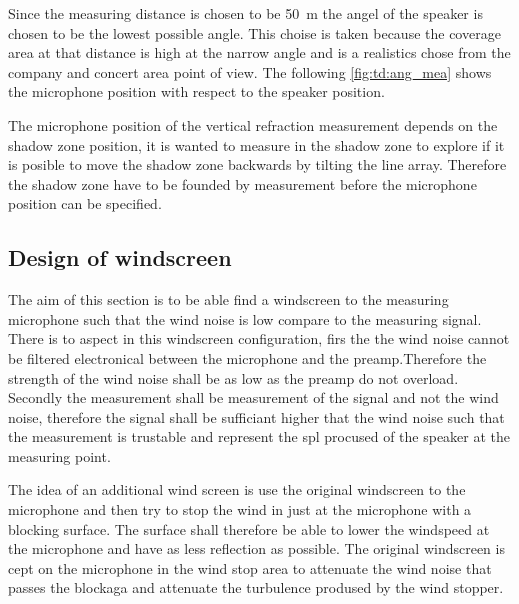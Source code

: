 Since the measuring distance is chosen to be \SI{50}{\meter} the angel of the speaker is chosen to be the lowest possible angle. This choise is taken because the coverage area at that distance is high at the narrow angle and is a realistics chose from the company and concert area point of view. The following \autoref{fig:td:ang_mea} shows the microphone position with respect to the speaker position.




The microphone position of the vertical refraction measurement depends on the shadow zone position, it is wanted to measure in the shadow zone to explore if it is posible to move the shadow zone backwards by tilting the line array. Therefore the shadow zone have to be founded by measurement before the microphone position can be specified.


\subsection{Design of windscreen}
The aim of this section is to be able find a windscreen to the measuring microphone such that the wind noise is low compare to the measuring signal. There is to aspect in this windscreen configuration, firs the the wind noise cannot be filtered electronical between the microphone and the preamp.Therefore the strength of the wind noise shall be as low as the preamp do not overload. Secondly the measurement shall be measurement of the signal and not the wind noise, therefore the signal shall be sufficiant higher that the wind noise such that the measurement is trustable and represent the \gls{spl} procused of the speaker at the measuring point. 

The idea of an additional wind screen is use the original windscreen to the microphone and then try to stop the wind in just at the microphone with a blocking surface. The surface shall therefore be able to lower the windspeed at the microphone and have as less reflection as possible. The original windscreen is cept on the microphone in the wind stop area to attenuate the wind noise that passes the blockaga and attenuate the turbulence prodused by the wind stopper. 

    
